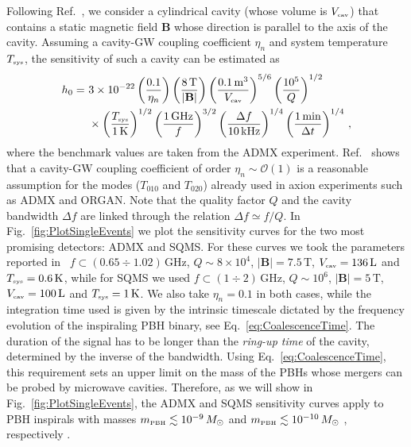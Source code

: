 \documentclass[11pt,a4paper]{article}
\begin{document}
Following Ref.~\cite{Berlin:2021txa}, we consider a cylindrical cavity (whose volume is $V_\text{\tiny cav}$) that contains a static magnetic field $\mathbf{B}$ whose direction is parallel to the axis of the cavity. Assuming a cavity-GW coupling coefficient $\eta_n$ and system temperature $T_\text{\tiny sys}$, the sensitivity of such a cavity can be estimated as
\begin{align}
h_0 = \,\, &
3 \times 10^{-22}
\left(\frac{0.1}{\eta_n}\right)
\left(\frac{8 \, \text{T}}{|\bf B|}\right) 
\left(\frac{0.1 \, \text{m}^3}{V_\text{\tiny cav}}\right)^{5/6}
\left(\frac{10^5}{Q}\right)^{1/2} 
\nonumber \\
& \times    
\left(\frac{T_\text{\tiny sys}}{1 \, \text{K}}\right)^{1/2} 
\left(\frac{1 \, \text{GHz}}{f}\right)^{3/2}
\left(\frac{\Delta f}{10 \, \text{kHz}}\right)^{1/4} 
\left(\frac{1 \, \text{min}}{\Delta t}\right)^{1/4}
\,,
\end{align}
where the benchmark values are taken from the ADMX experiment.  Ref.~\cite{Berlin:2021txa} shows that a cavity-GW coupling coefficient of order $\eta_n \sim \mathcal{O}(1)$ is a reasonable assumption for the modes ($T_{010}$ and $T_{020}$) already used in axion experiments such as ADMX and ORGAN. 
Note that the quality factor $Q$ and the cavity bandwidth $\Delta f$ are linked through the relation $\Delta f \simeq f/Q$. In Fig.~\ref{fig:PlotSingleEvents} we plot the sensitivity curves for the two most promising detectors: ADMX and SQMS. For these curves we took the parameters reported in~\cite{Berlin:2021txa} $f \subset(0.65 \div 1.02) \, \text{GHz}$, $Q \sim 8 \times 10^4$, $|\mathbf{B}| = 7.5 \, \text{T}$, $V_\text{\tiny cav} = 136 \, \text{L}$ and $T_\text{\tiny sys} = 0.6 \, \text{K}$, while for SQMS we used $f \subset(1 \div 2) \, \text{GHz}$, $Q \sim 10^6$, $|\mathbf{B}| = 5 \, \text{T}$, $V_\text{\tiny cav} = 100 \, \text{L}$ and $T_\text{\tiny sys} = 1 \, \text{K}$. We also take $\eta_n = 0.1$ in both cases, while the integration time used is given by the intrinsic timescale dictated by the frequency evolution of the inspiraling PBH binary, see Eq.~\eqref{eq:CoalescenceTime}. The duration of the signal has to be longer than the \textit{ring-up time} of the cavity, determined by the inverse of the bandwidth. Using Eq.~\eqref{eq:CoalescenceTime}, this requirement sets an upper limit on the mass of the PBHs whose mergers can be probed by microwave cavities. 
Therefore, as we will show in Fig.~\ref{fig:PlotSingleEvents}, the ADMX and SQMS sensitivity curves apply to PBH inspirals with masses  
$m_\text{\tiny PBH} \lesssim 10^{-9} \, M_\odot$ and 
$m_\text{\tiny PBH} \lesssim 10^{-10}\, M_\odot$ , respectively \cite{Berlin:2021txa}.
\end{document}

